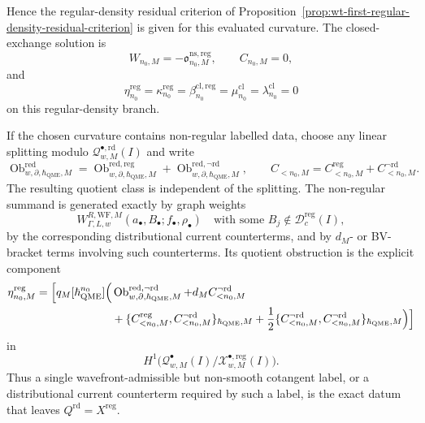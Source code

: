 \begin{prop}
  Hence the regular-density residual criterion of
  Proposition~\ref{prop:wt-first-regular-density-residual-criterion}
  is given for this evaluated curvature.  The closed-exchange
  solution is
  \[
    W_{n_0,M}
      =
    -\mathfrak o^{\mathrm{ns,reg}}_{n_0,M},
    \qquad
    C_{n_0,M}=0,
  \]
  and
  \[
    \eta^{\mathrm{reg}}_{n_0}
      =
    \kappa^{\mathrm{reg}}_{n_0}
      =
    \beta^{\mathrm{cl},\mathrm{reg}}_{n_0}
      =
    \mu^{\mathrm{cl}}_{n_0}
      =
    \lambda^{\mathrm{cl}}_{n_0}
      =
    0
  \]
  on this regular-density branch.

  If the chosen curvature contains non-regular labelled data, choose any
  linear splitting modulo
  \(\mathcal Q^{\bullet,\mathrm{rd}}_{w,M}(I)\) and write
  \[
    \operatorname{Ob}^{\mathrm{red}}_{w,\partial,\hbar_{\mathrm{QME}},M}
      =
    \operatorname{Ob}^{\mathrm{red,reg}}_{w,\partial,\hbar_{\mathrm{QME}},M}
      +
    \operatorname{Ob}^{\mathrm{red},\neg\mathrm{rd}}_{w,\partial,\hbar_{\mathrm{QME}},M},
    \qquad
    C_{<n_0,M}
      =
    C^{\mathrm{reg}}_{<n_0,M}
      +
    C^{\neg\mathrm{rd}}_{<n_0,M}.
  \]
  The resulting quotient class is independent of the splitting.  The
  non-regular summand is generated exactly by graph weights
  \[
    W^{R,\mathrm{WF},M}_{\Gamma,L,w}
      (a_\bullet,B_\bullet;f_\bullet,\rho_\bullet)
      \quad\text{with some }B_j\notin\mathcal D^{\mathrm{reg}}_c(I),
  \]
  by the corresponding distributional current counterterms, and by
  \(d_M\)- or BV-bracket terms involving such counterterms.  Its quotient
  obstruction is the explicit component
  \[
  \begin{aligned}
    \eta^{\mathrm{reg}}_{n_0,M}
      =
      \Bigl[
      q_M[\hbar_{\mathrm{QME}}^{n_0}]\Bigl(
        &\operatorname{Ob}^{\mathrm{red},\neg\mathrm{rd}}_{w,\partial,\hbar_{\mathrm{QME}},M}
        +d_MC^{\neg\mathrm{rd}}_{<n_0,M} \\
        &+\{C^{\mathrm{reg}}_{<n_0,M},
             C^{\neg\mathrm{rd}}_{<n_0,M}\}_{\hbar_{\mathrm{QME}},M}
        +\frac12
          \{C^{\neg\mathrm{rd}}_{<n_0,M},
             C^{\neg\mathrm{rd}}_{<n_0,M}\}_{\hbar_{\mathrm{QME}},M}
      \Bigr)\Bigr]
  \end{aligned}
  \]
  in
  \[
    H^1\bigl(
      \mathcal Q^\bullet_{w,M}(I)/
      \mathcal X^{\bullet,\mathrm{reg}}_{w,M}(I)
    \bigr).
  \]
  Thus a single wavefront-admissible but non-smooth cotangent label, or a
  distributional current counterterm required by such a label, is the exact
  datum that leaves \(Q^{\mathrm{rd}}=X^{\mathrm{reg}}\).
\end{prop}

